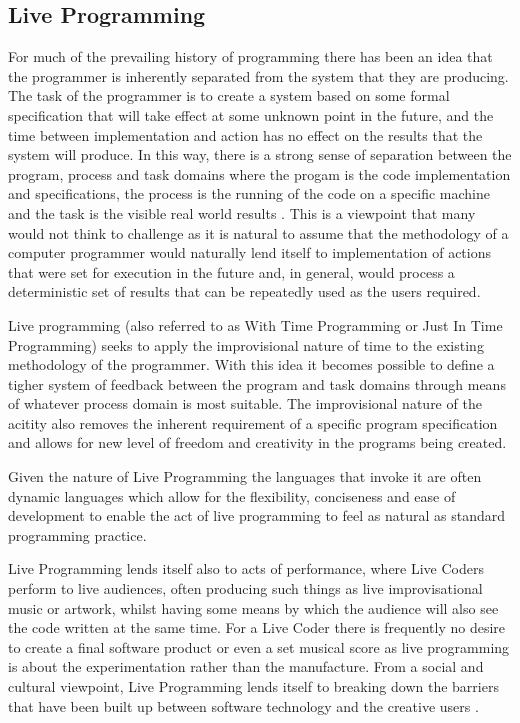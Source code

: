 \documentclass[11pt, abstracton, twoside, titlepage=true]{scrartcl}
\begin{document}
\subsection{Live Programming}
For much of the prevailing history of programming there has been an idea that 
the programmer is inherently separated from the system that they are 
producing. The task of the programmer is to create a system based on some 
formal specification that will take effect at some unknown point in the 
future, and the time between implementation and action has no effect on the 
results that the system will produce. In this way, there is a strong sense of 
separation between the program, process and task domains where the progam is 
the code implementation and specifications, the process is the running of the 
code on a specific machine and the task is the visible real world results
\cite{SG10}. This is a viewpoint that many would not think to challenge as it 
is natural to assume that the methodology of a computer programmer would 
naturally lend itself to implementation of actions that were set for execution 
in the future and, in general, would process a deterministic set of results 
that can be repeatedly used as the users required.

Live programming (also referred to as With Time Programming or Just In Time 
Programming) seeks to apply the improvisional nature of time to the existing 
methodology of the programmer. With this idea it becomes possible to define a 
tigher system of feedback between the program and task domains through means 
of whatever process domain is most suitable. The improvisional nature of the 
acitity also removes the inherent requirement of a specific program 
specification and allows for new level of freedom and creativity in the 
programs being created. 

Given the nature of Live Programming the languages that invoke it are often 
dynamic languages which allow for the flexibility, conciseness and ease of 
development \cite{McD07} to enable the act of live programming to feel as 
natural as standard programming practice.

Live Programming lends itself also to acts of performance, where Live Coders 
perform to live audiences, often producing such things as live 
improvisational music or artwork, whilst having some means by which the 
audience will also see the code written at the same time. For a Live Coder 
there is frequently no desire to create a final software product or even a set 
musical score as live programming is about the experimentation rather than the 
manufacture. From a social and cultural viewpoint, Live Programming lends 
itself to breaking down the barriers that have been built up between software 
technology and the creative users \cite{McL13}.
\end{document}
